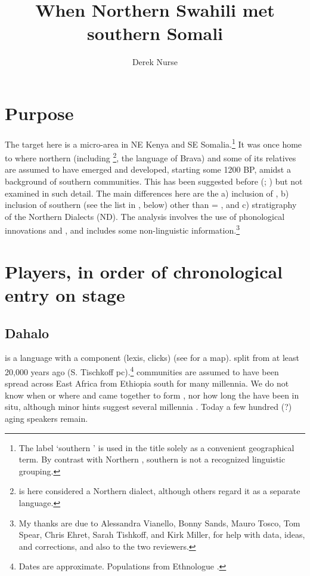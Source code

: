 \documentclass[output=paper
,newtxmath
,modfonts
,nonflat]{langsci/langscibook}
\title{When Northern Swahili met southern Somali}
\author{%
 Derek Nurse \affiliation{\ }
}
\begin{document}
\maketitle


\section{Purpose}\label{sec:nurse:1} 

The target here is a micro-area in NE Kenya and SE Somalia.\footnote{The label ‘southern ’ is used in the title solely as a convenient geographical term. By contrast with Northern , southern  is not a recognized linguistic grouping.} It was once home to where northern  (including \footnote{ is here considered a Northern  dialect, although others regard it as a separate language.}, the language of Brava) and some of its relatives are assumed to have emerged and developed, starting some 1200 BP, amidst a background of southern  communities. This has been suggested before (\citealt{Nurse1983}; \citeyear{Nurse1985}) but not examined in such detail. The main differences here are the a) inclusion of , b) inclusion of southern  (see the list in , below) other than  = , and c) stratigraphy of the Northern  Dialects (ND). The analysis involves the use of phonological innovations and , and includes some non-linguistic information.\footnote{My thanks are due to Alessandra Vianello, Bonny Sands, Mauro Tosco, Tom Spear, Chris Ehret, Sarah Tishkoff, and Kirk Miller, for help with data, ideas, and corrections, and also to the two reviewers.} 

\section{Players, in order of chronological entry on stage}\label{sec:nurse:2}

\subsection{Dahalo}\label{sec:nurse:2.1} 

 is a  language with a  component (lexis, clicks) (see  for a map).  split from  at least 20,000 years ago (S. Tischkoff pc).\footnote{Dates are approximate. Populations from Ethnologue \citep{Lewis2015}.}   communities are assumed to have been spread across East Africa from Ethiopia south for many millennia. We do not know when or where  and  came together to form , nor how long the  have been in situ, although minor hints suggest several millennia \citep{Nurse1986}. Today a few hundred (?) aging  speakers remain. 
\end{document}
